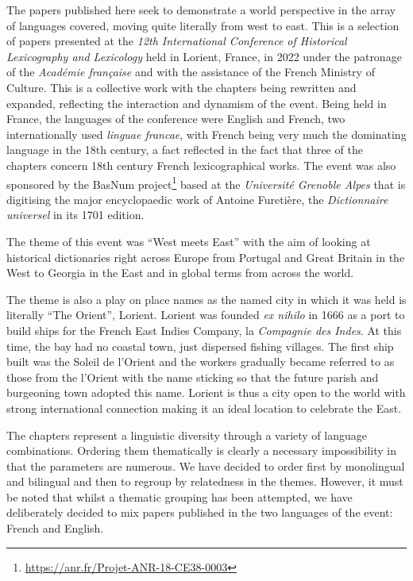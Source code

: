 \documentclass[output=paper]{langscibook}
\begin{document}
The papers published here seek to demonstrate a world perspective in the array of languages covered, moving quite literally from west to east. This is a selection of papers presented at the \textit{12th International Conference of Historical Lexicography and Lexicology} held in Lorient, France, in 2022 under the patronage of the \textit{Académie française} and with the assistance of the French Ministry of Culture. This is a collective work with the chapters being rewritten and expanded, reflecting the interaction and dynamism of the event. Being held in France, the languages of the conference were English and French, two internationally used \textit{linguae francae}, with French being very much the dominating language in the 18th century, a fact reflected in the fact that three of the chapters concern 18th century French lexicographical works. The event was also sponsored by the BasNum project\footnote{\url{https://anr.fr/Projet-ANR-18-CE38-0003}} based at the \textit{Université Grenoble Alpes} that is digitising the major encyclopaedic work of Antoine Furetière, the \textit{Dictionnaire universel} in its 1701 edition. 


The theme of this event was “West meets East” with the aim of looking at historical dictionaries right across Europe from Portugal and Great Britain in the West to Georgia in the East and in global terms from across the world. 

The theme is also a play on place names as the named city in which it was held is literally “The Orient”, Lorient. Lorient was founded \textit{ex nihilo} in 1666 as a port to build ships for the French East Indies Company, la \textit{Compagnie des Indes}. At this time, the bay had no coastal town, just dispersed fishing villages. The first ship built was the Soleil de l'Orient and the workers gradually became referred to as those from the l’Orient with the name sticking so that the future parish and burgeoning town adopted this name. Lorient is thus a city open to the world with strong international connection making it an ideal location to celebrate the East.

The chapters represent a linguistic diversity through a variety of language combinations. Ordering them thematically is clearly a necessary impossibility in that the parameters are numerous. We have decided to order first by monolingual and bilingual and then to regroup by relatedness in the themes. However, it must be noted that whilst a thematic grouping has been attempted, we have deliberately decided to mix papers published in the two languages of the event: French and English. 
\end{document}
